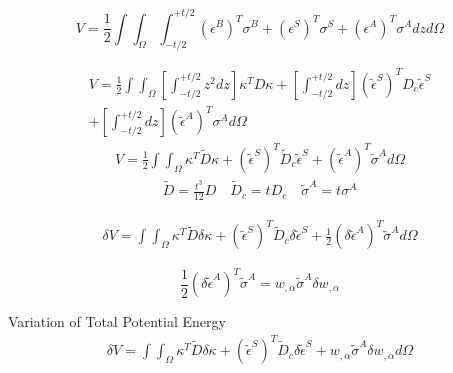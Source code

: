 \documentclass[9pt]{beamer}
\begin{document}
\begin{frame}
\begin{equation*}
V=\frac{1}{2}\int\int_\Omega \int_{-t/2}^{+t/2} \left(\epsilon^B\right)^T \sigma^B + \left(\epsilon^S\right)^T \sigma^S + \left(\epsilon^A\right)^T \sigma^A dz d \Omega
\end{equation*}

\begin{equation*}
\begin{split}
V=\frac{1}{2} \int\int_\Omega
\left[ \int_{-t/2}^{+t/2} z^2 dz\right]
  \kappa^T D  \kappa 
+ \left[ \int_{-t/2}^{+t/2} dz\right]\left(\tilde{\epsilon}^S\right)^T {D_c} \tilde{\epsilon}^S \\
+ \left[ \int_{-t/2}^{+t/2} dz\right]
 \left(\tilde{\epsilon}^A\right)^T \sigma^A  d \Omega
\end{split}
\end{equation*}
\begin{equation*}
\begin{split}
V=\frac{1}{2} \int\int_\Omega  \kappa^T \tilde{D}  \kappa 
+ \left(\tilde{\epsilon}^S\right)^T {\tilde{D}_c} \tilde{\epsilon}^S 
+ \left(\tilde{\epsilon}^A\right)^T \tilde{\sigma}^A  d \Omega
\end{split}
\end{equation*}
\begin{equation*}
\begin{split}
 \tilde{D} = \frac{t^3}{12}D \quad \tilde{D}_c = t{D}_c 
\quad \tilde{\sigma}^A  = t{\sigma}^A
\end{split}
\end{equation*}
\end{frame}

\begin{frame}

\begin{equation*}
\begin{split}
\delta V=\int\int_\Omega  \kappa^T \tilde{D}  \delta \kappa 
+ \left(\tilde{\epsilon}^S\right)^T {\tilde{D}_c}  \delta \tilde{\epsilon}^S 
+ \frac{1}{2} \left( \delta  \tilde{\epsilon}^A\right)^T \tilde{\sigma}^A  d \Omega
\end{split}
\end{equation*}


\begin{equation*}
\frac{1}{2} \left( \delta  \tilde{\epsilon}^A\right)^T \tilde{\sigma}^A =
w_{, \alpha} \tilde{\sigma}^A  \delta w_{, \alpha}
\end{equation*}

\begin{block}{Variation of Total Potential Energy}
\begin{equation*}
\begin{split}
\delta V=\int\int_\Omega  \kappa^T \tilde{D}  \delta \kappa 
+ \left(\tilde{\epsilon}^S\right)^T {\tilde{D}_c}  \delta \tilde{\epsilon}^S 
+ w_{, \alpha} \tilde{\sigma}^A  \delta w_{, \alpha}  d \Omega
\end{split}
\end{equation*}

\end{block}
\end{frame}
\end{document}
